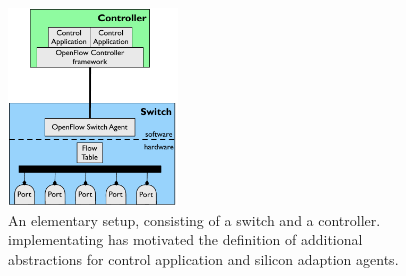 \begin{figure}
  \begin{center}
\includegraphics[width=0.40\textwidth]{Background/BackgroundFigs/openflow-schema}
\caption[An elementary \of setup]{An elementary \of setup, consisting of a
switch and a controller.  implementating \of has motivated the definition of
additional abstractions for control application and silicon adaption 
agents.}
\label{fig:background:openflow-schema}
\end{center}
\end{figure}
